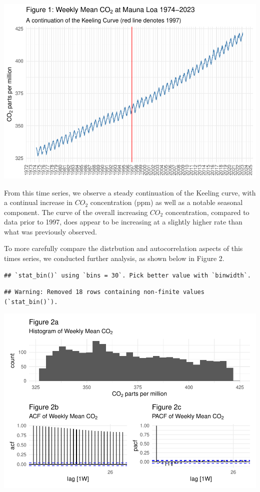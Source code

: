 \documentclass[AER]{AEA}
\begin{document}
\includegraphics{co2_present_files/figure-latex/present time series-1.pdf}

From this time series, we observe a steady continuation of the Keeling
curve, with a continual increase in \(CO_{2}\) concentration (ppm) as
well as a notable seasonal component. The curve of the overall
increasing \(CO_{2}\) concentration, compared to data prior to 1997,
does appear to be increasing at a slightly higher rate than what was
previously observed.

To more carefully compare the distrbution and autocorrelation aspects of
this times series, we conducted further analysis, as shown below in
Figure 2.

\begin{verbatim}
## `stat_bin()` using `bins = 30`. Pick better value with `binwidth`.
\end{verbatim}

\begin{verbatim}
## Warning: Removed 18 rows containing non-finite values (`stat_bin()`).
\end{verbatim}

\includegraphics{co2_present_files/figure-latex/present histogram ACF PACF-1.pdf}
\end{document}
